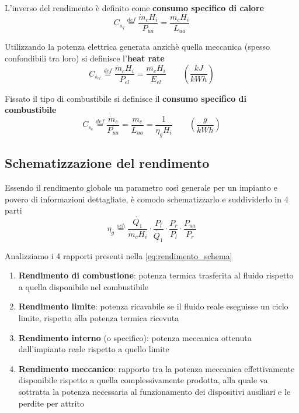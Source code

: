 \documentclass[a4paper,12pt]{article}
\begin{document}
L'inverso del rendimento è definito come \textbf{consumo specifico di calore}
\begin{equation}
	C_{s_q} \stackrel{def}{=} \frac{\dot{m}_c H_i}{P_{ua}} = \frac{m_c H_i}{L_{ua}}
\end{equation}

Utilizzando la {potenza elettrica} generata anzichè quella meccanica
(spesso confondibili tra loro) si definisce l'\textbf{heat rate}
\begin{equation}
 	C_{s_{el}} \stackrel{def}{=} \frac{\dot{m}_c H_i}{P_{el}} = \frac{m_c H_i}{E_{el}} 
 	\qquad\left(\frac{kJ}{kWh} \right)
\end{equation}

Fissato il tipo di combustibile si definisce il \textbf{consumo specifico di 
combustibile}
\begin{equation}
	C_{s_c} \stackrel{def}{=} \frac{\dot{m}_c}{P_{ua}} = \frac{m_c}{L_{ua}} = \frac{1}
	{\eta_gH_i} \qquad\left(\frac{g}{kWh} \right)
\end{equation}
\subsection*{Schematizzazione del rendimento}
\label{subsec:rendimento_schema}
Essendo il rendimento globale un parametro così generale per un impianto e povero
di informazioni dettagliate, è comodo schematizzarlo e suddividerlo in 4 parti
\begin{equation}
\label{eq:rendimento_schema}
 	\eta_g \stackrel{sch}{=} \frac{\dot{Q_1}}{\dot{m}_c H_i}\cdot \frac{P_l}{\dot{Q_1}}
	 \cdot \frac{P_r}{P_l}\cdot \frac{P_{ua}}{P_r}
\end{equation}

Analizziamo i 4 rapporti presenti nella \eqref{eq:rendimento_schema}
\begin{enumerate}
    \item \textbf{Rendimento di combustione}: potenza termica trasferita al fluido 
    rispetto a quella disponibile nel combustibile

    \item \textbf{Rendimento limite}:
    potenza ricavabile se il fluido reale eseguisse un ciclo limite, rispetto alla 
    potenza termica ricevuta

    \item \textbf{Rendimento interno} (o specifico): potenza meccanica ottenuta 
    dall'impianto reale rispetto a quello limite

    \item \textbf{Rendimento meccanico}: rapporto tra la potenza meccanica effettivamente 
    disponibile rispetto a quella complessivamente prodotta, alla quale va sottratta la 
    potenza necessaria al funzionamento dei dispositivi ausiliari e le perdite per 
    attrito
\end{enumerate}
\end{document}
